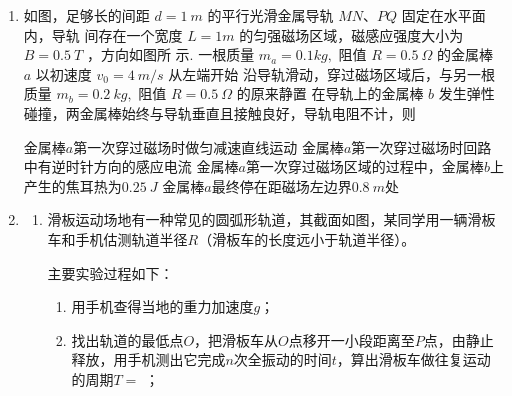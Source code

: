 \begin{enumerate}
\item
如图，足够长的间距 $d=1 \ m$ 的平行光滑金属导轨 $M N $、$ P Q$ 固定在水平面内，导轨 间存在一个宽度 $L=1 m$ 的匀强磁场区域，磁感应强度大小为 $B=0.5  \ T $ ，方向如图所
示. 一根质量 $m_{a}=0.1 kg,$ 阻值 $R=0.5 \ \Omega$ 的金属棒 $a$ 以初速度 $v_{0}=4  \ m/s$ 从左端开始
沿导轨滑动，穿过磁场区域后，与另一根质量 $m_{b}=0.2 \ kg,$ 阻值 $R=0.5 \ \Omega$ 的原来静置
在导轨上的金属棒 $b$ 发生弹性碰撞，两金属棒始终与导轨垂直且接触良好，导轨电阻不计，则   
\begin{figure}[h!]
	\centering
	
\end{figure}


\fourchoices
{金属棒$ a $第一次穿过磁场时做匀减速直线运动}
{金属棒$ a $第一次穿过磁场时回路中有逆时针方向的感应电流}
{金属棒$ a $第一次穿过磁场区域的过程中，金属棒$ b $上产生的焦耳热为$ 0.25 \ J $}
{金属棒$ a $最终停在距磁场左边界$ 0.8 \ m $处}




\gaokaosy

\item 
\begin{enumerate}
	\item
滑板运动场地有一种常见的圆弧形轨道，其截面如图，某同学用一辆滑板车和手机估测轨道半径$ R $（滑板车的长度远小于轨道半径）。
\begin{figure}[h!]
	\centering
	
\end{figure}



主要实验过程如下： 
\begin{enumerate}
	\item
用手机查得当地的重力加速度$ g $； 

\item 
找出轨道的最低点$ O $，把滑板车从$ O $点移开一小段距离至$ P $点，由静止释放，用手机测出它完成$ n $次全振动的时间$ t $，算出滑板车做往复运动的周期$ T= $ \underlinegap ； 


\end{enumerate}
\end{enumerate}
\end{enumerate}
